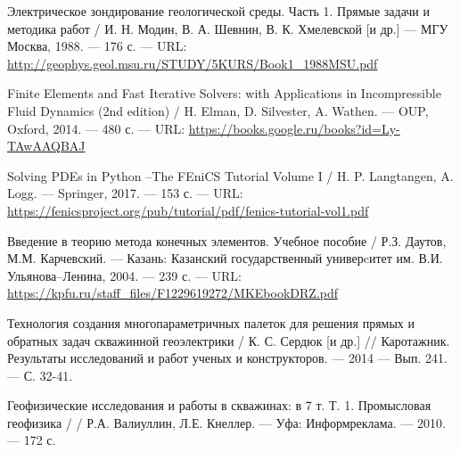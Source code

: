 \begingroup 
\renewcommand{\section}[2]{\anonsection{Библиографический список}}
\begin{thebibliography}{00}

    Электрическое зондирование геологической среды. Часть 1. Прямые задачи и методика работ /
    И. Н. Модин, В. А. Шевнин, В. К. Хмелевской [и др.]
    --- МГУ Москва, 1988.
    --- 176 с.
    --- URL: \url{http://geophys.geol.msu.ru/STUDY/5KURS/Book1_1988MSU.pdf}
   
    Finite Elements and Fast Iterative Solvers: with Applications in Incompressible Fluid Dynamics (2nd edition) /
    H. Elman, D. Silvester, A. Wathen.
    --- OUP, Oxford, 2014. 
    --- 480 с.
    --- URL: \url{https://books.google.ru/books?id=Ly-TAwAAQBAJ}

    Solving PDEs in Python --The FEniCS Tutorial Volume I /
    H. P. Langtangen, A. Logg.
    --- Springer, 2017.
    --- 153 с.
    --- URL: \url{https://fenicsproject.org/pub/tutorial/pdf/fenics-tutorial-vol1.pdf}

    Введение в теорию метода конечных элементов. Учебное пособие /
    Р.З. Даутов, М.М. Карчевский.
    — Казань: Казанский государственный универcитет им. В.И. Ульянова–Ленина, 2004.
    — 239 с.
    --- URL: \url{https://kpfu.ru/staff_files/F1229619272/MKEbookDRZ.pdf}

    Технология создания многопараметричных
    палеток для решения прямых и обратных задач
    скважинной геоэлектрики /
    К. С. Сердюк [и др.] //
    Каротажник. Результаты исследований и работ ученых и конструкторов.
    --- 2014
    --- Вып. 241.
    --- С. 32-41.

    Геофизические исследования и работы в скважинах: в 7 т. Т. 1.
    Промысловая геофизика /
    / Р.А. Валиуллин, Л.Е. Кнеллер.
    --- Уфа: Информреклама.
    --- 2010.
    --- 172 с.

\end{thebibliography}
\endgroup

\clearpage
